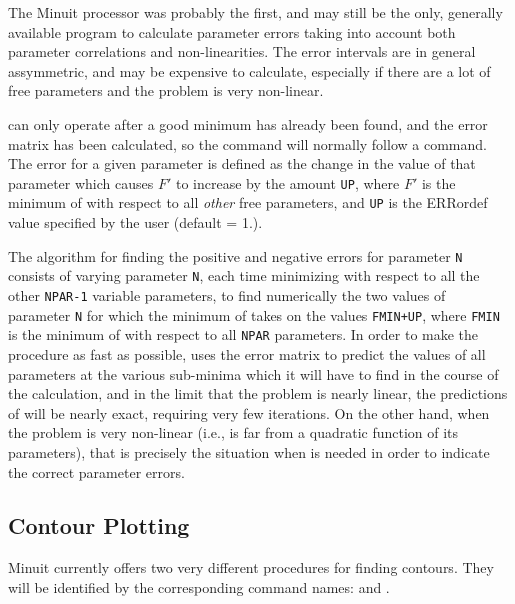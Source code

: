 The Minuit processor  was probably the first, and may still be the only,
generally available program to calculate parameter errors taking into
account both parameter correlations and non-linearities.
The  error intervals are in general assymmetric, and may be expensive
to calculate, especially if there are a lot of free parameters and the
problem is very non-linear.
 
 can only operate after a good minimum has already been found, and
the error matrix has been calculated, so the  command will
normally follow a  command.
The  error for a given parameter is defined as the change in the
value of that parameter which causes $F'$ to increase by the amount \texttt{UP},
where $F'$ is the minimum of  with respect to all {\it other}
free parameters, and \texttt{UP} is the ERRordef value specified by the
user (default = 1.).
 
The algorithm for finding the positive and negative  errors for
parameter \texttt{N} consists of varying parameter \texttt{N}, each time minimizing
 with respect to all the other \texttt{NPAR-1} variable parameters,
to find numerically the two values of parameter \texttt{N} for which the
minimum of  takes on the values \texttt{FMIN+UP}, where \texttt{FMIN} is the
minimum of  with respect to all \texttt{NPAR} parameters.
In order to make the procedure as fast as possible,  uses the
error matrix to predict the values of all parameters at the
various sub-minima which it will have to find in the course of the
calculation, and in the limit that the problem is nearly linear,
the predictions of  will be nearly exact, requiring very
few iterations.  On the other hand, when the problem is very
non-linear (i.e.,  is far from a quadratic function of its
parameters), that is precisely the situation when  is needed
in order to indicate the correct parameter errors.

\subsection{Contour Plotting}

Minuit currently offers two very different procedures for finding
 contours.  They will be identified by the corresponding
command names:  and .
 
